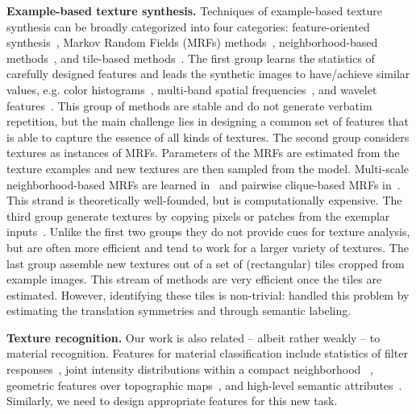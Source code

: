 \textbf{Example-based texture synthesis.}  Techniques of example-based
texture synthesis can be broadly categorized into four categories:
feature-oriented synthesis~\citep{Heeger:95, Debonet:97,
  Portilla:2000:IJCV, random:phase}, Markov Random Fields (MRFs)
methods~\citep{paget:tip98, zhu:frame, Zalesny05}, neighborhood-based
methods~\citep{Efros:sig2001, Kwatra:2003, Kwatra:tog:2005,
  dai:facade:iccv13}, and tile-based methods~\citep{Cohen:2003:wang,
  Liu:2004:NTA}.  The first group learns the statistics of carefully
designed features and leads the synthetic images to have/achieve
similar values, e.g. color histograms~\citep{Heeger:95}, multi-band
spatial frequencies~\citep{Debonet:97}, and wavelet
features~\citep{Portilla:2000:IJCV}. This group of methods are stable
and do not generate verbatim repetition, but the main challenge lies
in designing a common set of features that is able to capture the
essence of all kinds of textures.  The second group considers textures
as instances of MRFs. Parameters of the MRFs are estimated from the
texture examples and new textures are then sampled from the
model. Multi-scale neighborhood-based MRFs are learned
in~\citep{paget:tip98} and pairwise clique-based MRFs
in~\citep{Zalesny05}. This strand is theoretically well-founded, but is
computationally expensive. The third group generate textures by
copying pixels or patches from the exemplar inputs~\citep{Efros:1999,
  Efros:sig2001, Kwatra:2003, Kwatra:tog:2005,
  dai:facade:iccv13}. Unlike the first two groups they do not provide
cues for texture analysis, but are often more efficient and tend to
work for a larger variety of textures. The last group assemble new
textures out of a set of (rectangular) tiles cropped from example
images. This stream of methods are very efficient once the tiles are
estimated. However, identifying these tiles is non-trivial:
\citep{liu:ijcv:05} handled this problem by estimating the translation
symmetries and \citep{dai:facade:iccv13} through semantic labeling.

\textbf{Texture recognition.}  Our work is also related -- albeit
rather weakly -- to material recognition. Features for material
classification include statistics of filter
responses~\citep{texton:2001, Manjunath96, Schmid01}, joint intensity
distributions within a compact neighborhood ~\citep{material:pami:09,
  sorted:texture}, geometric features over topographic
maps~\citep{xia:texture}, and high-level semantic
attributes~\citep{semantic:texture}.  Similarly, we need
to design appropriate features for this new task.


